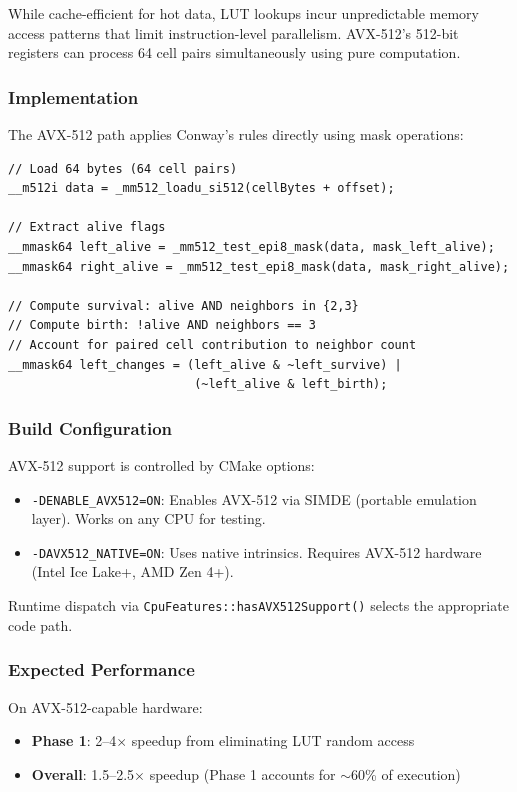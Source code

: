 \documentclass[11pt]{article}
\theoremstyle{definition}
\begin{document}
    While cache-efficient for hot data, LUT lookups incur unpredictable memory access patterns that limit instruction-level parallelism. AVX-512's 512-bit registers can process 64 cell pairs simultaneously using pure computation.

    \subsubsection{Implementation}

    The AVX-512 path applies Conway's rules directly using mask operations:

    \begin{lstlisting}
// Load 64 bytes (64 cell pairs)
__m512i data = _mm512_loadu_si512(cellBytes + offset);

// Extract alive flags
__mmask64 left_alive = _mm512_test_epi8_mask(data, mask_left_alive);
__mmask64 right_alive = _mm512_test_epi8_mask(data, mask_right_alive);

// Compute survival: alive AND neighbors in {2,3}
// Compute birth: !alive AND neighbors == 3
// Account for paired cell contribution to neighbor count
__mmask64 left_changes = (left_alive & ~left_survive) |
                          (~left_alive & left_birth);
    \end{lstlisting}

    \subsubsection{Build Configuration}

    AVX-512 support is controlled by CMake options:

    \begin{itemize}
        \item \texttt{-DENABLE\_AVX512=ON}: Enables AVX-512 via SIMDE (portable emulation layer). Works on any CPU for testing.
        \item \texttt{-DAVX512\_NATIVE=ON}: Uses native intrinsics. Requires AVX-512 hardware (Intel Ice Lake+, AMD Zen 4+).
    \end{itemize}

    Runtime dispatch via \texttt{CpuFeatures::hasAVX512Support()} selects the appropriate code path.

    \subsubsection{Expected Performance}

    On AVX-512-capable hardware:
    \begin{itemize}
        \item \textbf{Phase 1}: 2--4$\times$ speedup from eliminating LUT random access
        \item \textbf{Overall}: 1.5--2.5$\times$ speedup (Phase 1 accounts for $\sim$60\% of execution)
    \end{itemize}
\end{document}
